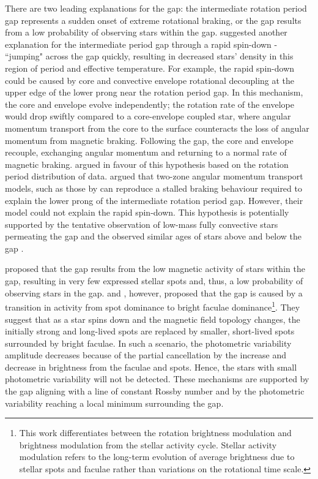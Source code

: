 There are two leading explanations for the gap: the intermediate rotation period gap represents a sudden onset of extreme rotational braking, or the gap results from a low probability of observing stars within the gap.
\citet{mcquillan_rotation_2014} suggested another explanation for the intermediate period gap through a rapid spin-down - ``jumping" across the gap quickly, resulting in decreased stars' density in this region of period and effective temperature.
For example, the rapid spin-down could be caused by core and convective envelope rotational decoupling at the upper edge of the lower prong near the rotation period gap.
In this mechanism, the core and envelope evolve independently; the rotation rate of the envelope would drop swiftly compared to a core-envelope coupled star, where angular momentum transport from the core to the surface counteracts the loss of angular momentum from magnetic braking.
Following the gap, the core and envelope recouple, exchanging angular momentum and returning to a normal rate of magnetic braking. 
\citet{gordon_stellar_2021} argued in favour of this hypothesis based on the rotation period distribution of \ktoo{} data. 
\citet{curtis_when_2020} argued that two-zone angular momentum transport models, such as those by \citet{spada_competing_2020} can reproduce a stalled braking behaviour required to explain the lower prong of the intermediate rotation period gap. However, their model could not explain the rapid spin-down.
This hypothesis is potentially supported by the tentative observation of low-mass fully convective stars permeating the gap and the observed similar ages of stars above and below the gap \citep{lu_bridging_2022}.

\citet{chahal_statistics_2022} proposed that the gap results from the low magnetic activity of stars within the gap, resulting in very few expressed stellar spots and, thus, a low probability of observing stars in the gap.
\citet{reinhold_transition_2019} and \citet{reinhold_stellar_2020}, however, proposed that the gap is caused by a transition in activity from spot dominance to bright faculae dominance\footnote{This work differentiates between the rotation brightness modulation and brightness modulation from the stellar activity cycle. Stellar activity modulation refers to the long-term evolution of average brightness due to stellar spots and faculae rather than variations on the rotational time scale.}.
They suggest that as a star spins down and the magnetic field topology changes, the initially strong and long-lived spots are replaced by smaller, short-lived spots surrounded by bright faculae.
In such a scenario, the photometric variability amplitude decreases because of the partial cancellation by the increase and decrease in brightness from the faculae and spots.
Hence, the stars with small photometric variability will not be detected.
These mechanisms are supported by the gap aligning with a line of constant Rossby number and by the photometric variability reaching a local minimum surrounding the gap.

